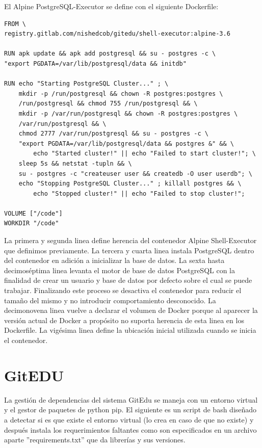 El Alpine PostgreSQL-Executor se define con el siguiente Dockerfile:
\begin{lstlisting}
FROM \
registry.gitlab.com/nishedcob/gitedu/shell-executor:alpine-3.6

RUN apk update && apk add postgresql && su - postgres -c \
"export PGDATA=/var/lib/postgresql/data && initdb"

RUN echo "Starting PostgreSQL Cluster..." ; \
    mkdir -p /run/postgresql && chown -R postgres:postgres \
    /run/postgresql && chmod 755 /run/postgresql && \
    mkdir -p /var/run/postgresql && chown -R postgres:postgres \
    /var/run/postgresql && \
    chmod 2777 /var/run/postgresql && su - postgres -c \
    "export PGDATA=/var/lib/postgresql/data && postgres &" && \
        echo "Started cluster!" || echo "Failed to start cluster!"; \
    sleep 5s && netstat -tupln && \
    su - postgres -c "createuser user && createdb -O user userdb"; \
    echo "Stopping PostgreSQL Cluster..." ; killall postgres && \
        echo "Stopped cluster!" || echo "Failed to stop cluster!";

VOLUME ["/code"]
WORKDIR "/code"
\end{lstlisting}
La primera y segunda linea define herencia del contenedor Alpine Shell-Executor que definimos previamente. La tercera y cuarta linea instala PostgreSQL dentro del contenedor en adición a inicializar la base de datos. La sexta hasta decimoséptima linea levanta el motor de base de datos PostgreSQL con la finalidad de crear un usuario y base de datos por defecto sobre el cual se puede trabajar. Finalizando este proceso se desactiva el contenedor para reducir el tamaño del mismo y no introducir comportamiento desconocido. La decimonovena linea vuelve a declarar el volumen de Docker porque al aparecer la versión actual de Docker a propósito no suporta herencia de esta linea en los Dockerfile. La vigésima linea define la ubicación inicial utilizada cuando se inicia el contenedor.
\index{Docker|)}

\section{GitEDU}

La gestión de dependencias del sistema GitEdu se maneja con un entorno virtual y el gestor de paquetes de python pip. El siguiente es un script de bash diseñado a detectar si es que existe el entorno virtual (lo crea en caso de que no existe) y después instala los requerimientos faltantes como son especificados en un archivo aparte ''requirements.txt'' que da librerías y sus versiones.

